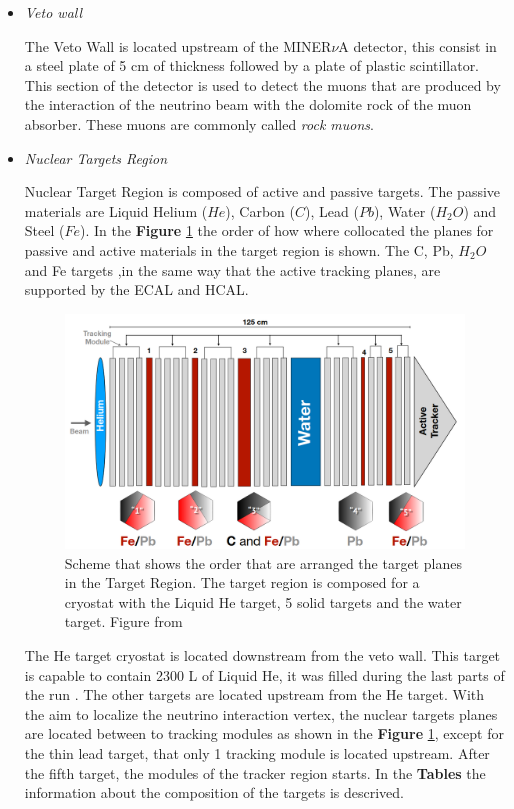 \begin{itemize}
    \item \textit{Veto wall}

    The Veto Wall is located upstream of the MINER$\nu$A detector, this consist in a steel plate of 5 cm of thickness followed by a plate of plastic scintillator. This section of the detector is used to detect the muons that are produced by the interaction of the neutrino beam with the dolomite rock of the muon absorber. These muons are commonly called \textit{rock muons}.

    \item \textit{Nuclear Targets Region}

    Nuclear Target Region is composed of active and passive targets. The passive materials are Liquid Helium ($He$), Carbon ($C$), Lead ($Pb$), Water ($H_2O$) and Steel ($Fe$). In the \textbf{Figure} \ref{fig:MnvExp:MnvDetector:TargetRegion} the order of how where collocated the planes for passive and active materials in the target region is shown. The C, Pb, $H_2O$ and Fe targets ,in the same way that the active tracking planes, are supported by the ECAL and HCAL.
    
    \begin{figure}[!htb]
    \centering
    \includegraphics[scale=0.35]{Figures/Chapter2/TargetRegion1.png}

        \caption{Scheme that shows the order that are arranged the target planes in the Target Region. The target region is composed for a cryostat with the Liquid He target, 5 solid targets and the water target. Figure from \cite{MarvinThesis}} 
    \label{fig:MnvExp:MnvDetector:TargetRegion}
    \end{figure}
    
    The He target cryostat is located downstream from the veto wall. This target is capable to contain 2300 L of Liquid He, it was filled during the last parts of the run \cite{ALIAGA2014130}. The other targets are located upstream from the He target. With the aim to localize the neutrino interaction vertex, the nuclear targets planes are located between to tracking modules as shown in the \textbf{Figure} \ref{fig:MnvExp:MnvDetector:TargetRegion}, except for the thin lead target, that only 1 tracking module is located upstream. After the fifth target, the modules of the tracker region starts. In the \textbf{Tables} the information about the composition of the targets is descrived. 


\end{itemize}
